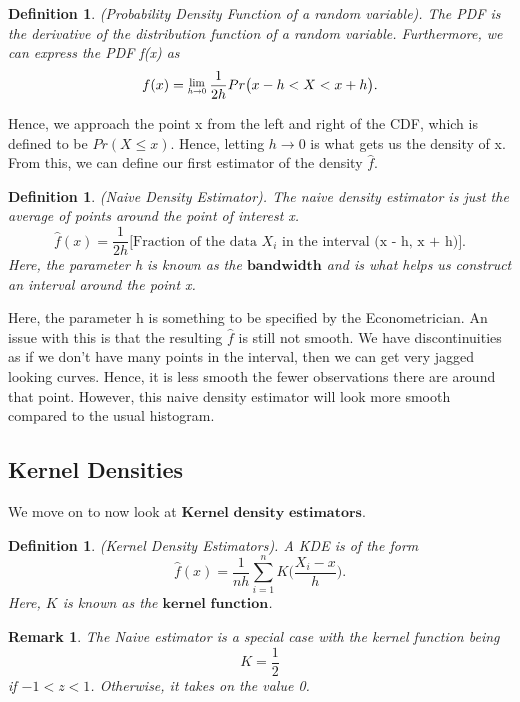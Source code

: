 \documentclass[twoside]{article}
\newcommand{\Lim}[1]{\raisebox{0.5ex}{\scalebox{0.8}{$\displaystyle \lim_{#1}\;$}}}
\newtheorem{definition}[theorem]{Definition}
\newtheorem{remark}[theorem]{Remark}
\begin{document}
\begin{definition}(Probability Density Function of a random variable). The PDF is the derivative of the distribution function of a random variable. Furthermore, we can express the PDF f(x) as 
$$
f(x) = \Lim{h \rightarrow 0}\frac{1}{2h}Pr\big(x - h < X < x + h\big).
$$
\end{definition}

Hence, we approach the point x from the left and right of the CDF, which is defined to be $Pr(X \leq x)$. Hence, letting $h \rightarrow 0$ is what gets us the density of x. From this, we can define our first estimator of the density $\hat{f}$.

\begin{definition}(Naive Density Estimator). The naive density estimator is just the average of points around the point of interest x.
$$
\hat{f}(x) = \frac{1}{2h}\big[\text{Fraction of the data }X_i \text{ in the interval (x - h, x + h)}\big].
$$
Here, the parameter h is known as the $\textbf{bandwidth}$ and is what helps us construct an interval around the point x.
\end{definition}

Here, the parameter h is something to be specified by the Econometrician. An issue with this is that the resulting $\hat{f}$ is still not smooth. We have discontinuities as if we don't have many points in the interval, then we can get very jagged looking curves. Hence, it is less smooth the fewer observations there are around that point. However, this naive density estimator will look more smooth compared to the usual histogram.

\subsection{Kernel Densities}
We move on to now look at $\textbf{Kernel density estimators}$. 

\begin{definition}(Kernel Density Estimators). A KDE is of the form
$$
\hat{f}(x) = \frac{1}{nh}\sum_{i=1}^nK\big(\frac{X_i - x}{h}\big).
$$
Here, $K$ is known as the $\textbf{kernel function}$.
\end{definition}

\begin{remark}The Naive estimator is a special case with the kernel function being 
$$
K = \frac{1}{2}
$$
if $-1 < z < 1$. Otherwise, it takes on the value 0.
\end{remark}
\end{document}
